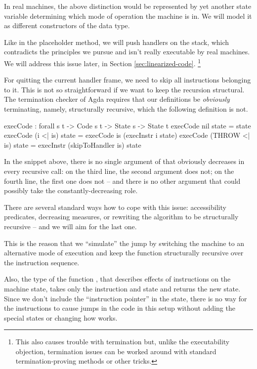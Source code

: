 In real machines, the above distinction would be represented by yet another
state variable determining which mode of operation the machine is in.
We will model it as different constructors of the  data type.

Like in the placeholder method, we will push handlers on the stack, which
contradicts the principles we pursue and isn't really executable by real
machines. We will address this issue later, in Section \ref{sec:linearized-code}.%
\footnote{This also causes trouble with termination but, unlike the
executability objection, termination issues can be worked around with
standard termination-proving methods or other tricks.}

For quitting the current handler frame, we need to skip all instructions
belonging to it. This is not so straightforward if we want to keep the
recursion structural. The termination checker of Agda requires that our
definitions be \emph{obviously} terminating, namely, structurally recursive,
which the following definition is not.
\begin{code}
  execCode : forall {s t} -> Code s t -> State s -> State t
  execCode nil state = state
  execCode (i <| is) state = execCode is (execInstr i state)
  execCode (THROW <| is) state = execInstr (skipToHandler is) state
\end{code}
In the snippet above, there is no single argument of  that
obviously decreases in every recursive call: on the third line, the second
argument does not; on the fourth line, the first one does not -- and there
is no other argument that could possibly take the constantly-decreasing role.

There are several standard ways how to cope with this issue: accessibility
predicates, decreasing measures, or rewriting the algorithm to be
structurally recursive -- and we will aim for the last one.

This is the reason that we ``simulate'' the jump by switching the machine to an
alternative mode of execution and keep the function 
structurally recursive over the instruction sequence.

Also, the type of the function , that describes effects of
instructions on the machine state, takes only the instruction and state and
returns the new state. Since we don't include the ``instruction pointer'' in
the state, there is no way for the instructions to cause jumps in the code in
this setup without adding the special states or changing how  works.

